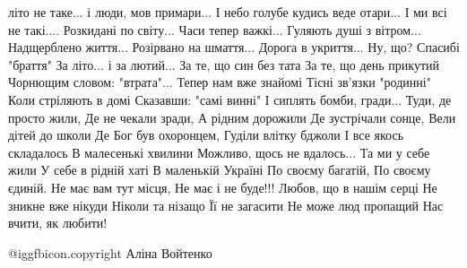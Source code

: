  
 
 
 
 

\obeycr
 літо не таке...
 і люди, мов примари...
І небо голубе кудись веде отари...
І ми всі не такі....
Розкидані по світу...
Часи тепер важкі...
Гуляють душі з вітром...
Надщерблено життя...
Розірвано на шмаття...
Дорога в укриття...
Ну, що? Спасибі "браття"
За літо... і за лютий...
За те, що син без тата
За те, що день прикутий 
Чорнющим словом: "втрата"...
Тепер нам вже знайомі
Тісні зв'язки "родинні"
Коли стріляють в домі
Сказавши: "самі винні"
І сиплять бомби, гради...
Туди, де просто жили,
Де не чекали зради,
А рідним дорожили
Де зустрічали сонце,
Вели дітей до школи
Де Бог був охоронцем, 
Гуділи влітку бджоли
І все якось складалось
В малесенькі хвилини
Можливо, щось не вдалось...
Та ми у себе жили
У себе в рідній хаті 
В маленькій Україні
По своєму багатій,
По своєму єдиній.
Не має вам тут місця,
Не має і не буде!!!
Любов, що в нашім серці 
Не зникне вже нікуди
Ніколи та нізащо
Її не загасити
Не може люд пропащий 
Нас вчити, як любити!
\restorecr

@igg{fbicon.copyright} Аліна Войтенко
